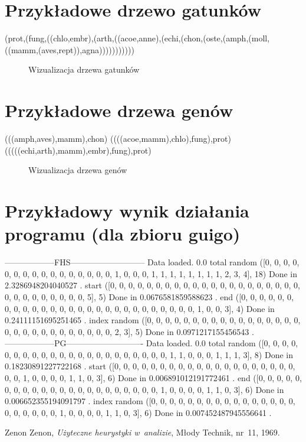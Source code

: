 \documentclass[licencjacka]{pracamgr}
\begin{document}
\chapter{Przykładowe drzewo gatunków}

\begin{center}
(prot,(fung,((chlo,embr),(arth,((acoe,anne),(echi,(chon,(oste,(amph,(moll,((mamm,(aves,rept)),agna)))))))))))
\end{center}

\begin{figure}[tp]
  \centering
  \caption{Wizualizacja drzewa gatunków}
\end{figure}

\chapter{Przykładowe drzewa genów}

{\obeylines %
(((amph,aves),mamm),chon)
((((acoe,mamm),chlo),fung),prot)
(((((echi,arth),mamm),embr),fung),prot)
}

\begin{figure}[tp]
  \centering
  \caption{Wizualizacja drzewa genów}
\end{figure}



\chapter{Przykładowy wynik działania programu
    (dla zbioru guigo)}

{\obeylines %
------------------FHS---------------------------
Data loaded. 0.0%
total random
([0, 0, 0, 0, 0, 0, 0, 0, 0, 0, 0, 0, 0, 0, 0, 0, 1, 0, 0, 0, 1, 1, 1, 1, 1, 1, 1, 1, 2, 3, 4], 18)
Done in 2.3286948204040527 .
start
([0, 0, 0, 0, 0, 0, 0, 0, 0, 0, 0, 0, 0, 0, 0, 0, 0, 0, 0, 0, 0, 0, 0, 0, 0, 0, 0, 0, 0, 0, 5], 5)
Done in 0.0676581859588623 .
end
([0, 0, 0, 0, 0, 0, 0, 0, 0, 0, 0, 0, 0, 0, 0, 0, 0, 0, 0, 0, 0, 0, 0, 0, 0, 0, 0, 1, 0, 0, 3], 4)
Done in 0.24111151695251465 .
index random
([0, 0, 0, 0, 0, 0, 0, 0, 0, 0, 0, 0, 0, 0, 0, 0, 0, 0, 0, 0, 0, 0, 0, 0, 0, 0, 0, 0, 0, 2, 3], 5)
Done in 0.0971217155456543 .
------------------PG----------------------------
Data loaded. 0.0%
total random
([0, 0, 0, 0, 0, 0, 0, 0, 0, 0, 0, 0, 0, 0, 0, 0, 0, 0, 0, 0, 0, 0, 1, 1, 0, 0, 0, 1, 1, 1, 3], 8)
Done in 0.18230891227722168 .
start
([0, 0, 0, 0, 0, 0, 0, 0, 0, 0, 0, 0, 0, 0, 0, 0, 0, 0, 0, 0, 0, 0, 1, 0, 0, 0, 0, 1, 1, 0, 3], 6)
Done in 0.006891012191772461 .
end
([0, 0, 0, 0, 0, 0, 0, 0, 0, 0, 0, 0, 0, 0, 0, 0, 0, 0, 0, 0, 0, 0, 1, 0, 0, 0, 0, 1, 1, 0, 3], 6)
Done in 0.006652355194091797 .
index random
([0, 0, 0, 0, 0, 0, 0, 0, 0, 0, 0, 0, 0, 0, 0, 0, 0, 0, 0, 0, 0, 0, 1, 0, 0, 0, 0, 1, 1, 0, 3], 6)
Done in 0.007452487945556641 .
}

\begin{thebibliography}{99}


 Zenon Zenon, \textit{Użyteczne heurystyki
    w~analizie}, Młody Technik, nr~11, 1969.

\end{thebibliography}
\end{document}
